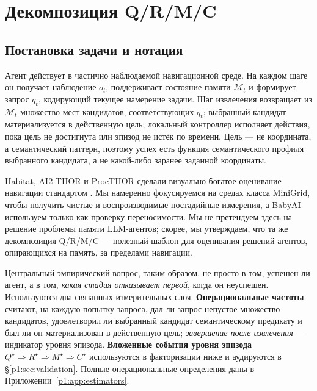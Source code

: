 \documentclass{article}
\begin{document}
\section{Декомпозиция Q/R/M/C}
\label{p1:sec:framework}

\subsection{Постановка задачи и нотация}
\label{p1:sec:notation}

Агент действует в частично наблюдаемой навигационной среде.
На каждом шаге он получает наблюдение $o_t$, поддерживает состояние памяти
$\mathcal{M}_t$ и формирует запрос $q_t$, кодирующий текущее
намерение задачи. Шаг извлечения возвращает из $\mathcal{M}_t$ множество мест-кандидатов,
соответствующих $q_t$; выбранный кандидат
материализуется в действенную цель; локальный контроллер исполняет
действия, пока цель не достигнута или эпизод не истёк по времени.
Цель --- не координата, а семантический паттерн, поэтому успех есть
функция семантического профиля выбранного кандидата, а не какой-либо
заранее заданной координаты.

Habitat, AI2-THOR и ProcTHOR сделали визуально богатое оценивание навигации
стандартом
\citep{savva2019habitat,kolve2017ai2thor,deitke2022procthor}. Мы
намеренно фокусируемся на средах класса MiniGrid, чтобы получить чистые и
воспроизводимые постадийные измерения, а BabyAI используем только как проверку
переносимости. Мы не претендуем здесь на решение проблемы памяти LLM-агентов; скорее, мы
утверждаем, что та же декомпозиция Q/R/M/C --- полезный шаблон для
оценивания решений агентов, опирающихся на память, за пределами навигации.

Центральный эмпирический вопрос, таким образом, не просто в том, успешен ли агент,
а в том, \emph{какая стадия отказывает первой}, когда он неуспешен. Используются два
связанных измерительных слоя. \textbf{Операциональные частоты} считают,
на каждую попытку запроса, дал ли запрос непустое множество кандидатов,
удовлетворил ли выбранный кандидат семантическому предикату
и был ли он материализован в действенную цель;
\emph{завершение после извлечения} --- индикатор уровня эпизода.
\textbf{Вложенные события уровня эпизода}
$Q^\star \Rightarrow R^\star \Rightarrow M^\star \Rightarrow C^\star$
используются в факторизации ниже и аудируются в
\S\ref{p1:sec:validation}. Полные операциональные определения даны в
Приложении~\ref{p1:app:estimators}.
\end{document}

